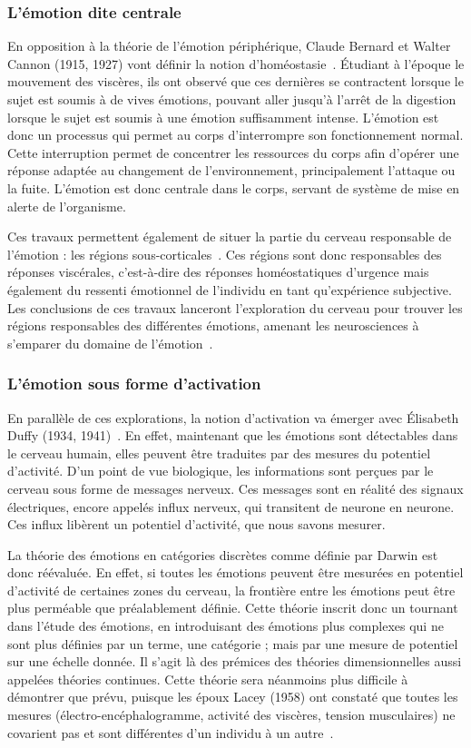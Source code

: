 \subsubsection{L'émotion dite centrale}
En opposition à la théorie de l'émotion périphérique, Claude Bernard et Walter Cannon (1915, 1927) vont définir la notion d’homéostasie~\cite{Cannon1915,Cannon1927}. Étudiant à l'époque le mouvement des viscères, ils ont observé que ces dernières se contractent lorsque le sujet est soumis à de vives émotions, pouvant aller jusqu'à l'arrêt de la digestion lorsque le sujet est soumis à une émotion suffisamment intense. L'émotion est donc un processus qui permet au corps d'interrompre son fonctionnement normal. Cette interruption permet de concentrer les ressources du corps afin d'opérer une réponse adaptée au changement de l'environnement, principalement l'attaque ou la fuite. L'émotion est donc centrale dans le corps, servant de système de mise en alerte de l'organisme.

Ces travaux permettent également de situer la partie du cerveau responsable de l'émotion : les régions sous-corticales~\cite{Cannon1933}. Ces régions sont donc responsables des réponses viscérales, c'est-à-dire des réponses homéostatiques d'urgence mais également du ressenti émotionnel de l'individu en tant qu'expérience subjective.
Les conclusions de ces travaux lanceront l'exploration du cerveau pour trouver les régions responsables des différentes émotions, amenant les neurosciences à s'emparer du domaine de l'émotion~\cite{Bard1934}.

\subsubsection{L'émotion sous forme d'activation}
En parallèle de ces explorations, la notion d'activation va émerger avec Élisabeth Duffy (1934, 1941)~\cite{Duffy1934,Duffy1941}. En effet, maintenant que les émotions sont détectables dans le cerveau humain, elles peuvent être traduites par des mesures du potentiel d'activité. D'un point de vue biologique, les informations sont perçues par le cerveau sous forme de messages nerveux. Ces messages sont en réalité des signaux électriques, encore appelés influx nerveux, qui transitent de neurone en neurone. Ces influx libèrent un potentiel d'activité, que nous savons mesurer.

La théorie des émotions en catégories discrètes comme définie par Darwin est donc réévaluée. En effet, si toutes les émotions peuvent être mesurées en potentiel d'activité de certaines zones du cerveau, la frontière entre les émotions peut être plus perméable que préalablement définie. Cette théorie inscrit donc un tournant dans l'étude des émotions, en introduisant des émotions plus complexes qui ne sont plus définies par un terme, une catégorie ; mais par une mesure de potentiel sur une échelle donnée. Il s'agit là des prémices des théories dimensionnelles aussi appelées théories continues.
Cette théorie sera néanmoins plus difficile à démontrer que prévu, puisque les époux Lacey (1958) ont constaté que toutes les mesures (électro-encéphalogramme, activité des viscères, tension musculaires) ne covarient pas et sont différentes d'un individu à un autre~\cite{Lacey1958}.

